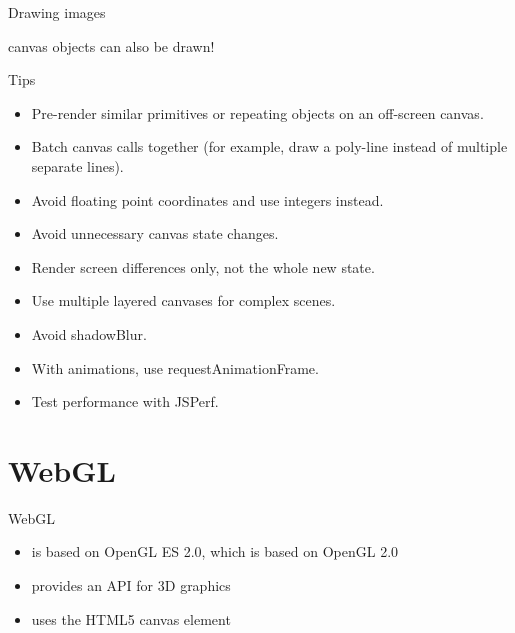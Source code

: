\documentclass{beamer}
\begin{document}
\begin{frame}{Drawing images}



canvas objects can also be drawn!

\end{frame}



\begin{frame}{Tips}
\begin{itemize}
    \item Pre-render similar primitives or repeating objects on an off-screen canvas.
    \item Batch canvas calls together (for example, draw a poly-line instead of multiple separate lines).
    \item Avoid floating point coordinates and use integers instead.
    \item Avoid unnecessary canvas state changes.
    \item Render screen differences only, not the whole new state.
    \item Use multiple layered canvases for complex scenes.
    \item Avoid shadowBlur.
    \item With animations, use requestAnimationFrame.
    \item Test performance with JSPerf.

\end{itemize}
\end{frame}


\section{WebGL}

\begin{frame}{WebGL}

\begin{itemize}
\item is based on OpenGL ES 2.0, which is based on OpenGL 2.0
\item provides an API for 3D graphics
\item uses the HTML5 canvas element
\end{itemize}

\end{frame}
\end{document}
